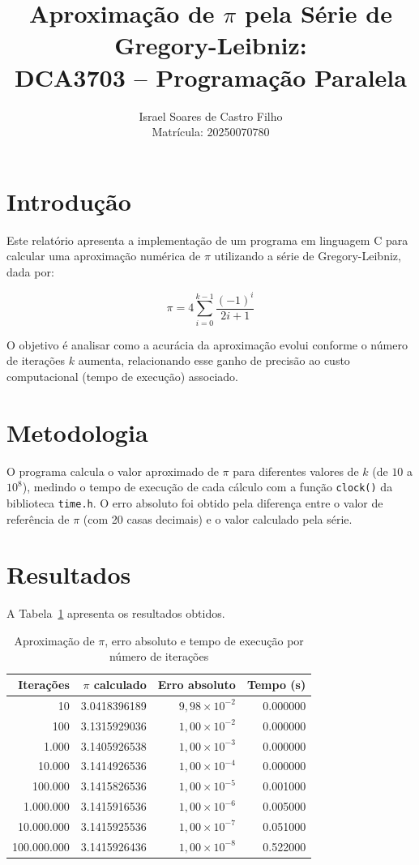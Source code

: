 \documentclass[a4paper,12pt]{article}
\title{Aproximação de $\pi$ pela Série de Gregory-Leibniz: \\ DCA3703 -- Programação Paralela}
\author{Israel Soares de Castro Filho \\ Matrícula: 20250070780}
\date{}
\begin{document}
\maketitle

\section{Introdução}

Este relatório apresenta a implementação de um programa em linguagem C para calcular
uma aproximação numérica de $\pi$ utilizando a série de Gregory-Leibniz, dada por:

\begin{equation}
    \pi = 4 \sum_{i=0}^{k-1} \frac{(-1)^i}{2i+1}
\end{equation}

O objetivo é analisar como a acurácia da aproximação evolui conforme o número de
iterações $k$ aumenta, relacionando esse ganho de precisão ao custo computacional
(tempo de execução) associado.

\section{Metodologia}

O programa calcula o valor aproximado de $\pi$ para diferentes valores de $k$
(de $10$ a $10^8$), medindo o tempo de execução de cada cálculo com a função
\texttt{clock()} da biblioteca \texttt{time.h}. O erro absoluto foi obtido pela
diferença entre o valor de referência de $\pi$ (com 20 casas decimais) e o valor
calculado pela série.

\section{Resultados}

A Tabela~\ref{tab:resultados} apresenta os resultados obtidos.

\begin{table}[h]
\centering
\caption{Aproximação de $\pi$, erro absoluto e tempo de execução por número de iterações}
\label{tab:resultados}
\begin{tabular}{rrrr}
\toprule
Iterações & $\pi$ calculado & Erro absoluto & Tempo (s) \\
\midrule
10          & 3.0418396189 & $9{,}98 \times 10^{-2}$ & 0.000000 \\
100         & 3.1315929036 & $1{,}00 \times 10^{-2}$ & 0.000000 \\
1.000       & 3.1405926538 & $1{,}00 \times 10^{-3}$ & 0.000000 \\
10.000      & 3.1414926536 & $1{,}00 \times 10^{-4}$ & 0.000000 \\
100.000     & 3.1415826536 & $1{,}00 \times 10^{-5}$ & 0.001000 \\
1.000.000   & 3.1415916536 & $1{,}00 \times 10^{-6}$ & 0.005000 \\
10.000.000  & 3.1415925536 & $1{,}00 \times 10^{-7}$ & 0.051000 \\
100.000.000 & 3.1415926436 & $1{,}00 \times 10^{-8}$ & 0.522000 \\
\bottomrule
\end{tabular}
\end{table}
\end{document}
